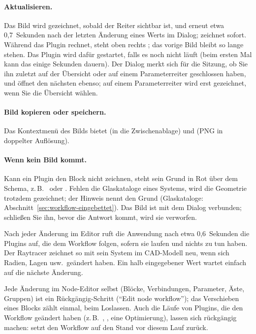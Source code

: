 \paragraph{Aktualisieren.} Das Bild wird gezeichnet, sobald der Reiter sichtbar ist, und
erneut etwa 0,7~Sekunden nach der letzten Änderung eines Werts im Dialog;  zeichnet
sofort. Während das Plugin rechnet, steht oben rechts ; das
vorige Bild bleibt so lange stehen. Das Plugin wird dafür gestartet, falls es noch nicht läuft
(beim ersten Mal kann das einige Sekunden dauern). Der Dialog merkt sich für die Sitzung, ob Sie
ihn zuletzt auf der Übersicht oder auf einem Parameterreiter geschlossen haben, und öffnet den
nächsten ebenso; auf einem Parameterreiter wird erst gezeichnet, wenn Sie die Übersicht wählen.

\paragraph{Bild kopieren oder speichern.} Das Kontextmenü des Bilds bietet 
(in die Zwischenablage) und  (PNG in doppelter Auflösung).

\paragraph{Wenn kein Bild kommt.} Kann ein Plugin den Block nicht zeichnen, steht sein Grund in
Rot über dem Schema, z.\,B.\ 
oder . Fehlen die Glaskataloge eines Systems, wird die Geometrie trotzdem
gezeichnet; der Hinweis  nennt den Grund
(Glaskataloge: Abschnitt~\ref{sec:workflow-eingebettet}). Das Bild ist mit dem Dialog verbunden;
schließen Sie ihn, bevor die Antwort kommt, wird sie verworfen.

\begin{hinweis}
Nach jeder Änderung im Editor ruft die Anwendung nach etwa 0,6~Sekunden die Plugins auf, die dem
Workflow folgen, sofern sie laufen und nichts zu tun haben. Der Raytracer zeichnet so mit
 sein System im CAD-Modell neu, wenn sich Radien, Lagen usw.\ geändert
haben. Ein halb eingegebener Wert wartet einfach auf die nächste Änderung.
\end{hinweis}

\begin{hinweis}
Jede Änderung im Node-Editor selbst (Blöcke, Verbindungen, Parameter, Äste, Gruppen) ist ein
Rückgängig-Schritt (\enquote{Edit node workflow}); das Verschieben eines Blocks zählt einmal,
beim Loslassen. Auch die Läufe von Plugins, die den Workflow geändert haben (z.\,B.\
, , eine Optimierung), lassen sich rückgängig
machen: \menu{Edit,Undo} setzt den Workflow auf den Stand vor diesem Lauf zurück.
\end{hinweis}

